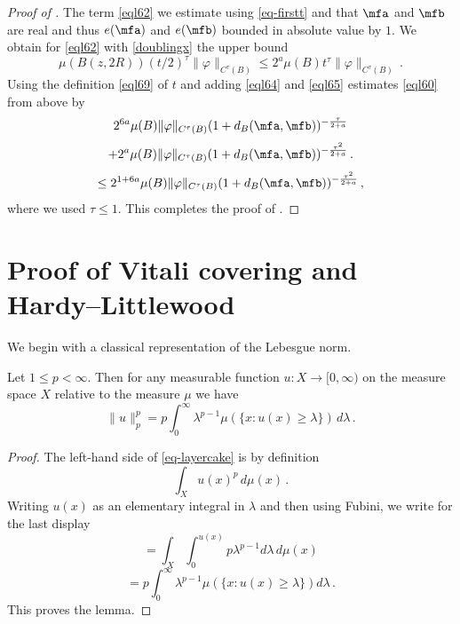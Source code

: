 \begin{proof}[Proof of ]
The term \eqref{eql62} we estimate using
\eqref{eq-firstt} and that
$\mfa$ and $\mfb$ are real and thus $e(\mfa)$ and
$e(\mfb)$ bounded in absolute value by $1$.
We obtain for \eqref{eql62} with \eqref{doublingx}
the upper bound
  \begin{equation}\label{eql65}
      \mu(B(z,2R)) (t/2)^{\tau} \|\varphi\|_{C^\tau(B)}
      \le 2^a \mu(B) t^{\tau} \|\varphi\|_{C^\tau(B)}
      \,.
 \end{equation}
Using the definition \eqref{eql69} of $t$ and adding
\eqref{eql64} and \eqref{eql65} estimates
\eqref{eql60} from above by
\begin{equation}
       2^{6a} \mu(B) \|{\varphi}\|_{C^\tau(B)}
       (1 + d_{B}(\mfa,\mfb))^{-\frac{\tau}{2+a}}
       \end{equation}
\begin{equation} +
        2^a \mu(B) \|{\varphi}\|_{C^\tau(B)}
       (1 + d_{B}(\mfa,\mfb))^{-\frac{\tau^2}{2+a}}\, .
 \end{equation}
\begin{equation}\label{eql66}
      \le 2^{1+6a} \mu(B) \|{\varphi}\|_{C^\tau(B)}
       (1 + d_{B}(\mfa,\mfb))^{-\frac{\tau^2}{2+a}} \, ,
 \end{equation}
where we used $\tau\le 1$.
This completes the proof of .
\end{proof}

\section{Proof of Vitali covering and Hardy--Littlewood}
\label{sec-hlm}


We begin with a classical representation of the Lebesgue norm.
\begin{lemma}\label{layer-cake-representation}
\leanok
{}
Let $1\le p< \infty$. Then for any measurable function $u:X\to [0,\infty)$ on the measure space $X$
relative to the measure $\mu$
we have
\begin{equation}\label{eq-layercake}
    \|u\|_p^p=p\int_0^\infty \lambda^{p-1}\mu(\{x: u(x)\ge \lambda\})\, d\lambda\, .
\end{equation}
\end{lemma}
\begin{proof}
    \leanok
    The left-hand side of \eqref{eq-layercake} is by definition
\begin{equation}
    \int_X u(x)^p \, d\mu(x)\, .\end{equation}
    Writing $u(x)$ as an elementary integral in $\lambda$ and then using Fubini, we write for the last display
    \begin{equation}
    =\int_X \int _0^{u(x)}
    p \lambda^{p-1} d\lambda\, d\mu(x)
\end{equation}
\begin{equation}
 =p\int _0^{\infty}
    \lambda^{p-1} \mu(\{x: u(x)\ge \lambda\}) d\lambda\, .
\end{equation}
This proves the lemma.
\end{proof}

